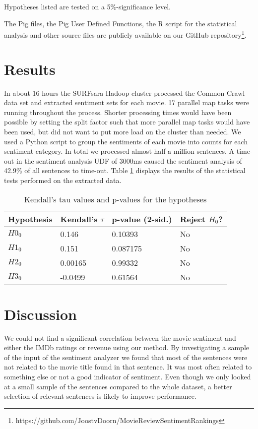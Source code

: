 \documentclass{sig-alternate-br}
\begin{document}
Hypotheses listed are tested on a 5\%-significance level.

The Pig files, the Pig User Defined Functions, the R script for the statistical analysis and other source files are publicly available on our GitHub repository\footnote{https://github.com/JoostvDoorn/MovieReviewSentimentRankings}.

\section{Results}
In about 16 hours the SURFsara Hadoop cluster processed the Common Crawl data set and extracted sentiment sets for each movie. 17 parallel map tasks were running throughout the process. Shorter processing times would have been possible by setting the split factor such that more parallel map tasks would have been used, but did not want to put more load on the cluster than needed. We used a Python script to group the sentiments of each movie into counts for each sentiment category. In total we processed almost half a million sentences. A time-out in the sentiment analysis UDF of 3000ms caused the sentiment analysis of 42.9\% of all sentences to time-out. Table \ref{tab:hypothesis_tests} displays the results of the statistical tests performed on the extracted data.
\begin{table}[!h!p]
\begin{tabular}{l|lll}
Hypothesis & Kendall's $\tau$ & p-value (2-sid.) & Reject $H_0$?\\
\hline
$H0_0$ & 0.146 & 0.10393 & No \\ 
$H1_0$ & 0.151 & 0.087175 & No \\ 
$H2_0$ & 0.00165 & 0.99332 & No \\ 
$H3_0$ & -0.0499 & 0.61564 & No\\ 
\end{tabular}
\caption{Kendall's tau values and p-values for the hypotheses}
\label{tab:hypothesis_tests}
\end{table}

\section{Discussion}
We could not find a significant correlation between the movie sentiment and either the IMDb ratings or revenue using our method. By investigating a sample of the input of the sentiment analyzer we found that most of the sentences were not related to the movie title found in that sentence. It was most often related to something else or not a good indicator of sentiment. Even though we only looked at a small sample of the sentences compared to the whole dataset, a better selection of relevant sentences is likely to improve performance.
\end{document}
